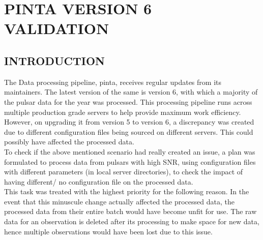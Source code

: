 \documentclass{article}
\begin{document}
\section{PINTA VERSION 6 VALIDATION}
\subsection{INTRODUCTION}
The Data processing pipeline, pinta, receives regular updates from its maintainers. The latest version of the same is version 6, with which a majority of the pulsar data for the year was processed. This processing pipeline runs across multiple production grade servers to help provide maximum work efficiency. However, on upgrading it from version 5 to version 6, a discrepancy was created due to different configuration files being sourced on different servers. This could possibly have affected the processed data.\\
To check if the above mentioned scenario had really created an issue, a plan was formulated to process data from pulsars with high SNR, using configuration files with different parameters (in local server directories), to check the impact of having different/ no configuration file on the processed data.\\
This task was treated with the highest priority for the following reason. In the event that this minuscule change actually affected the processed data, the processed data from their entire batch would have become unfit for use. The raw data for an observation is deleted after its processing to make space for new data, hence multiple observations would have been lost due to this issue.  
\end{document}
